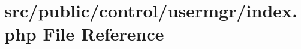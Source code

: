\hypertarget{control_2usermgr_2index_8php}{}\section{src/public/control/usermgr/index.php File Reference}
\label{control_2usermgr_2index_8php}

